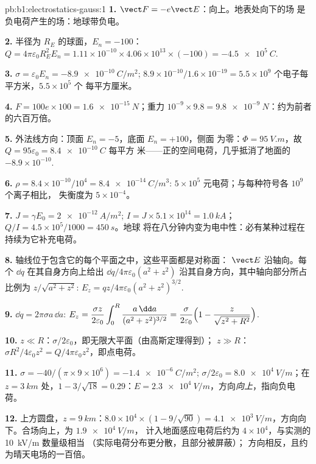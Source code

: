 \begin{solution}{pb:b1:electrostatics-gauss:1}
\textbf{1.} $\vect F = -e\vect E$：向上。地表处向下的场
是负电荷产生的场：地球带负电。

\textbf{2.} 半径为 $R_E$ 的球面，$E_n = -100$：$Q = 4\pi\varepsilon_0R_E^2E_n =
1.11 \times 10^{-10} \times 4.06 \times 10^{13} \times (-100) = \qty{-4.5e5}{C}$.

\textbf{3.} $\sigma = \varepsilon_0E_n = \qty{-8.9e-10}{C/m^2}$; $8.9 \times 10^{-10}/1.6 \times
10^{-19} = 5.5 \times 10^9$ 个电子每平方米，$5.5 \times 10^5$ 个
每平方厘米。

\textbf{4.} $F = 100e \times 100 = \qty{1.6e-15}{N}$；重力 $10^{-9} \times 9.8 =
\qty{9.8e-9}{N}$：约为前者的六百万倍。

\textbf{5.} 外法线方向：顶面 $E_n = -5$，底面 $E_n = +100$，侧面
为零：$\Phi = \qty{95}{V.m}$，故 $Q = 95\varepsilon_0 = \qty{+8.4e-10}{C}$ 每平方
米——正的空间电荷，几乎抵消了地面的
$-8.9 \times 10^{-10}$.

\textbf{6.} $\rho = 8.4 \times 10^{-10}/10^4 = \qty{8.4e-14}{C/m^3}$: $5 \times 10^5$
元电荷；与每种符号各 $10^9$ 个离子相比，
失衡度为 $5 \times 10^{-4}$。

\textbf{7.} $J = \gamma E_0 = \qty{2e-12}{A/m^2}$; $I = J \times 5.1 \times 10^{14} =
\qty{1.0}{kA}$；$Q/I = 4.5 \times 10^5/1000 = \qty{450}{s}$。地球
将在八分钟内变为电中性：必有某种过程在持续为它补充电荷。

\textbf{8.} 轴线位于包含它的每个平面之中，这些平面都是对称面：
$\vect E$ 沿轴向。每个 $\dd q$ 在其自身方向上给出 $\dd q/4\pi\varepsilon_0(a^2 + z^2)$
沿其自身方向，其中轴向部分所占比例为
$z/\sqrt{a^2 + z^2}$: $E_z = qz/4\pi\varepsilon_0(a^2 + z^2)^{3/2}$.

\textbf{9.} $\dd q = 2\pi\sigma a\,\dd a$: $E_z = \dfrac{\sigma z}{2\varepsilon_0}\displaystyle\int_0^R
\dfrac{a\,\dd a}{(a^2 + z^2)^{3/2}} = \dfrac{\sigma}{2\varepsilon_0}\Bigl(1 - \dfrac{z}{\sqrt{z^2
+ R^2}}\Bigr)$.

\textbf{10.} $z \ll R$：$\sigma/2\varepsilon_0$，即无限大平面（由高斯定理得到）；
$z \gg R$：$\sigma R^2/4\varepsilon_0z^2 = Q/4\pi\varepsilon_0z^2$，即点电荷。

\textbf{11.} $\sigma = -40/(\pi \times 9 \times 10^6) = \qty{-1.4e-6}{C/m^2}$; $\sigma/2\varepsilon_0 =
\qty{8.0e4}{V/m}$；在 $z = \qty{3}{km}$ 处，$1 - 3/\sqrt{18} = 0.29$：$E =
\qty{2.3e4}{V/m}$，方向\emph{向上}，指向负电荷。

\textbf{12.} 上方圆盘，$z = \qty{9}{km}$：$8.0 \times 10^4 \times (1 - 9/\sqrt{90}) =
\qty{4.1e3}{V/m}$，方向向下。合场向上，为 $\qty{1.9e4}{V/m}$，
计入地面感应电荷后约为 $4 \times 10^4$，与实测的 \qty{10}{kV/m} 数量级相当
（实际电荷分布更分散，且部分被屏蔽）；
方向相反，且约为晴天电场的一百倍。


\end{solution}

